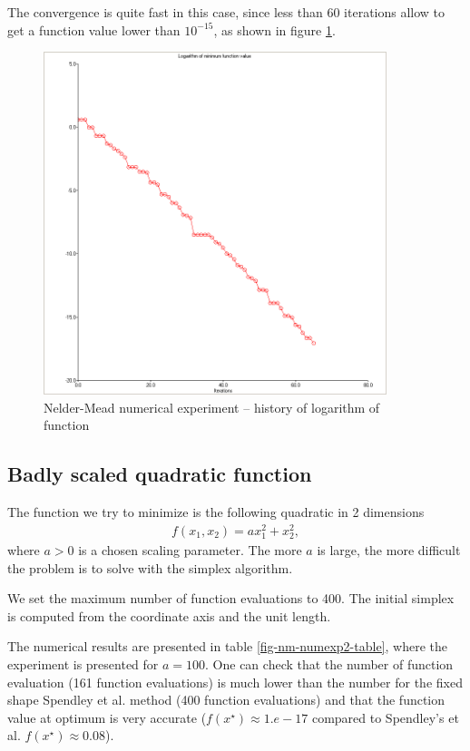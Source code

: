 The convergence is quite fast in this case, since less than 60 iterations
allow to get a function value lower than $10^{-15}$, as shown in 
figure \ref{fig-nm-numexp1-logfopt}.

\begin{figure}
\begin{center}
\includegraphics[width=10cm]{quad2bis-nm-history-logfopt.png}
\end{center}
\caption{Nelder-Mead numerical experiment -- history of logarithm of function}
\label{fig-nm-numexp1-logfopt}
\end{figure}

\subsection{Badly scaled quadratic function}

The function we try to minimize is the following quadratic 
in 2 dimensions 
\begin{eqnarray}
\label{quadratic-nm-function2}
f(x_1,x_2) = a x_1^2 + x_2^2,
\end{eqnarray}
where $a>0$ is a chosen scaling parameter. 
The more $a$ is large, the more difficult the problem is 
to solve with the simplex algorithm.

We set the maximum number of function evaluations to 400.
The initial simplex is computed from the coordinate axis and the unit length.

The numerical results are presented in table \ref{fig-nm-numexp2-table},
where the experiment is presented for $a=100$. One can check that the 
number of function evaluation (161 function evaluations) is much lower than the number 
for the fixed shape Spendley et al. method (400 function evaluations)
and that the function value at optimum is very accurate ($f(x^\star)\approx 1.e-17$
compared to Spendley's et al. $f(x^\star) \approx 0.08$).

